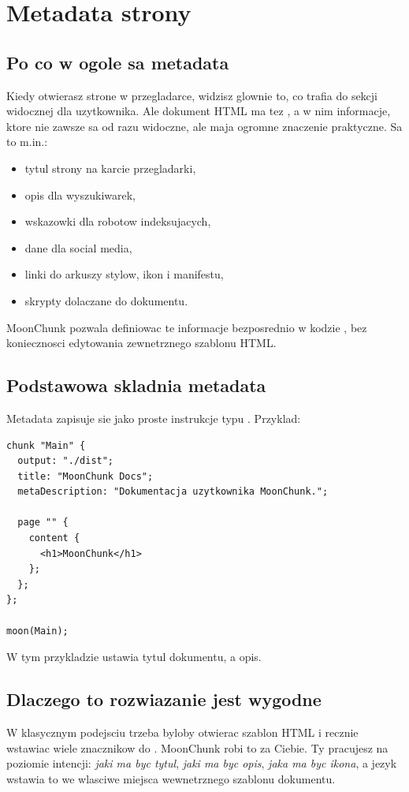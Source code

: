 \chapter{Metadata strony}

\section{Po co w ogole sa metadata}
Kiedy otwierasz strone w przegladarce, widzisz glownie to, co trafia do sekcji
widocznej dla uzytkownika. Ale dokument HTML ma tez , a w nim informacje,
ktore nie zawsze sa od razu widoczne, ale maja ogromne znaczenie praktyczne.
Sa to m.in.:

\begin{itemize}
  \item tytul strony na karcie przegladarki,
  \item opis dla wyszukiwarek,
  \item wskazowki dla robotow indeksujacych,
  \item dane dla social media,
  \item linki do arkuszy stylow, ikon i manifestu,
  \item skrypty dolaczane do dokumentu.
\end{itemize}

MoonChunk pozwala definiowac te informacje bezposrednio w kodzie , bez
koniecznosci edytowania zewnetrznego szablonu HTML.

\section{Podstawowa skladnia metadata}
Metadata zapisuje sie jako proste instrukcje typu . Przyklad:

\begin{lstlisting}[style=moonchunk,caption={Najprostsze metadata strony}]
chunk "Main" {
  output: "./dist";
  title: "MoonChunk Docs";
  metaDescription: "Dokumentacja uzytkownika MoonChunk.";

  page "" {
    content {
      <h1>MoonChunk</h1>
    };
  };
};

moon(Main);
\end{lstlisting}

W tym przykladzie  ustawia tytul dokumentu, a  opis.

\section{Dlaczego to rozwiazanie jest wygodne}
W klasycznym podejsciu trzeba byloby otwierac szablon HTML i recznie wstawiac wiele
znacznikow do . MoonChunk robi to za Ciebie. Ty pracujesz na poziomie
intencji: \emph{jaki ma byc tytul}, \emph{jaki ma byc opis}, \emph{jaka ma byc ikona},
a jezyk wstawia to we wlasciwe miejsca wewnetrznego szablonu dokumentu.

